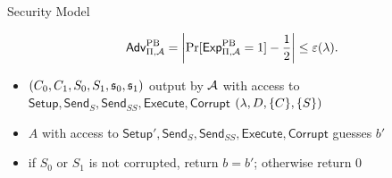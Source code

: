 \documentclass[notes,xcolor=dvipsnames]{beamer}
\begin{document}
\begin{frame}{Security Model}
  \begin{definition}\label{def:zk}
  \[ \mathsf{Adv}_{\Pi, \mathcal{A}}^{\mathrm{PB}}=\left|\Pr[\mathsf{Exp}_{\Pi, \mathcal{A}}^{\mathrm{PB}}=1]-\frac{1}{2}\right|\leq\varepsilon(\lambda). \]

  \begin{itemize}
    \item $(C_0, C_1, S_0, S_1,\mathfrak{s}_0,\mathfrak{s}_1)$ output by $\mathcal{A}$ with access to $\mathsf{Setup},\mathsf{Send}_S,\mathsf{Send}_{SS}, \mathsf{Execute},\mathsf{Corrupt}$ $(\lambda,D,\{C\},\{S\})$ 
    \item $A$ with access to $\mathsf{Setup}',\mathsf{Send}_S,\mathsf{Send}_{SS}, \mathsf{Execute},\mathsf{Corrupt}$ guesses $b'$
    \item if $S_0$ or $S_1$ is not corrupted, return $b=b'$; otherwise return $0$ 
  \end{itemize}

  \end{definition}
\end{frame}
\end{document}
